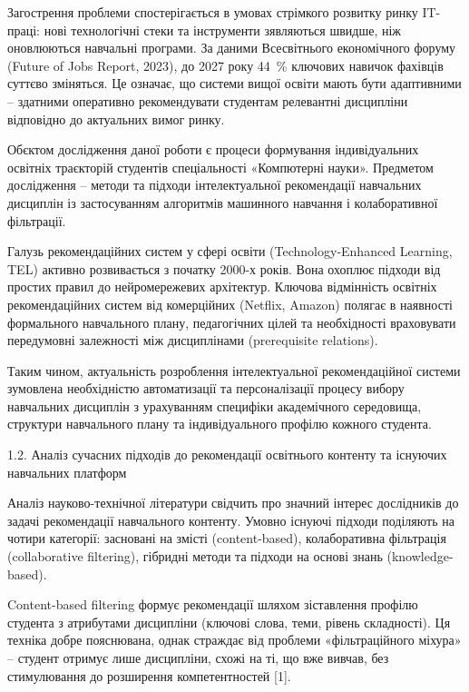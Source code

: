\documentclass[
]{article}
\begin{document}
Загострення проблеми спостерігається в умовах стрімкого розвитку ринку
IT-праці: нові технологічні стеки та інструменти
з\textquotesingle являються швидше, ніж оновлюються навчальні програми.
За даними Всесвітнього економічного форуму (Future of Jobs Report,
2023), до 2027 року 44~\% ключових навичок фахівців суттєво зміняться.
Це означає, що системи вищої освіти мають бути адаптивними -- здатними
оперативно рекомендувати студентам релевантні дисципліни відповідно до
актуальних вимог ринку.

Об\textquotesingle єктом дослідження даної роботи є процеси формування
індивідуальних освітніх траєкторій студентів спеціальності
«Комп\textquotesingle ютерні науки». Предметом дослідження -- методи та
підходи інтелектуальної рекомендації навчальних дисциплін із
застосуванням алгоритмів машинного навчання і колаборативної фільтрації.

Галузь рекомендаційних систем у сфері освіти (Technology-Enhanced
Learning, TEL) активно розвивається з початку 2000-х років. Вона охоплює
підходи від простих правил до нейромережевих архітектур. Ключова
відмінність освітніх рекомендаційних систем від комерційних (Netflix,
Amazon) полягає в наявності формального навчального плану, педагогічних
цілей та необхідності враховувати передумовні залежності між
дисциплінами (prerequisite relations).

Таким чином, актуальність розроблення інтелектуальної рекомендаційної
системи зумовлена необхідністю автоматизації та персоналізації процесу
вибору навчальних дисциплін з урахуванням специфіки академічного
середовища, структури навчального плану та індивідуального профілю
кожного студента.

\protect{}\label{_Toc230434080}{}1.2. Аналіз сучасних
підходів до рекомендації освітнього контенту та існуючих навчальних
платформ

Аналіз науково-технічної літератури свідчить про значний інтерес
дослідників до задачі рекомендації навчального контенту. Умовно існуючі
підходи поділяють на чотири категорії: засновані на змісті
(content-based), колаборативна фільтрація (collaborative filtering),
гібридні методи та підходи на основі знань (knowledge-based).

Content-based filtering формує рекомендації шляхом зіставлення профілю
студента з атрибутами дисципліни (ключові слова, теми, рівень
складності). Ця техніка добре пояснювана, однак страждає від проблеми
«фільтраційного міхура» -- студент отримує лише дисципліни, схожі на ті,
що вже вивчав, без стимулювання до розширення компетентностей {[}1{]}.
\end{document}
